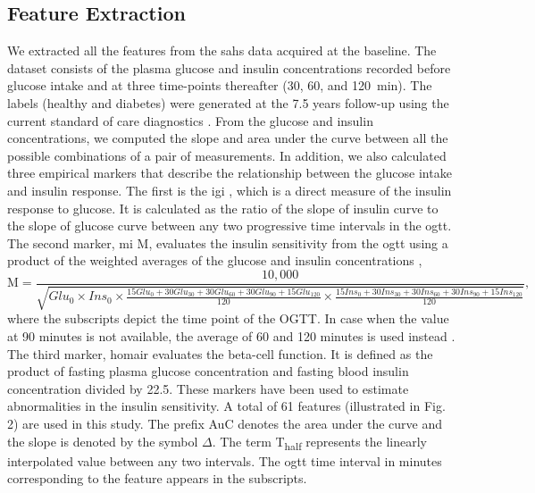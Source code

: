 \documentclass[journal,comsoc]{IEEEtran}
\renewcommand{\^}{\hat}  %
\begin{document}
\subsection{Feature Extraction}
%
We extracted all the features from the \ac{sahs} data acquired at the baseline. The dataset consists of the plasma glucose and insulin concentrations recorded before glucose intake and at three time-points thereafter (\num{30}, \num{60}, and \SI{120}{\minute}). The labels (healthy and diabetes) were generated at the \num{7.5} years follow-up using the current standard of care diagnostics \cite{burke_rapid_1999}. From the glucose and insulin concentrations, we computed the slope and area under the curve between all the possible combinations of a pair of measurements. In addition, we also calculated three empirical markers that describe the relationship between the glucose intake and insulin response. The first is the \ac{igi} \cite{seino1975insulinogenic}, which is a direct measure of the insulin response to glucose. It is calculated as the ratio of the slope of insulin curve to the slope of glucose curve between any two progressive time intervals in the \ac{ogtt}. The second marker, \ac{mi}  $\mathrm M$, evaluates the insulin sensitivity from the \ac{ogtt} using a product of the weighted averages of the glucose and insulin concentrations \cite{Matsuda1462},
%
\begin{equation}
  \mathrm{M} = \frac{10,000}{\sqrt{Glu_0 \times Ins_0 \times \frac{15 Glu_0 + 30 Glu_{30} + 30 Glu_{60} + 30 Glu_{90} + 15 Glu_{120}}{120} \times \frac{15 Ins_0 + 30 Ins_{30} + 30 Ins_{60} + 30 Ins_{90} + 15 Ins_{120}}{120}}},
  \label{eq:mat_idx}
\end{equation}
%
where the subscripts depict the time point of the OGTT. In case when the value at 90 minutes is not available, the average of 60 and 120 minutes is used instead \cite{Matsuda1462}. The third marker, \ac{homair} \cite{matthews1985homeostasis} evaluates the beta-cell function. It is defined as the product of fasting plasma glucose concentration and fasting blood insulin concentration divided by \num{22.5}. These markers have been used to estimate abnormalities in the insulin sensitivity. A total of \num{61} features (illustrated in Fig. 2) are used in this study. The prefix AuC denotes the area under the curve and the slope is denoted by the symbol $\Delta$. The term T\textsubscript{half} represents the linearly interpolated value between any two intervals. The \ac{ogtt} time interval in minutes corresponding to the feature appears in the subscripts.
%
\end{document}
